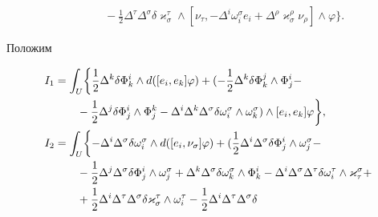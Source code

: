 \begin{pf}
\begin{align*}
&\qquad-\frac{1}{2}\Delta^{\tau}\Delta^{\sigma}\delta


\varkappa^{\tau}_{\sigma}\wedge[\nu_{\tau},


-\Delta^i\omega^{\sigma}_ie_i+\Delta^{\rho}\varkappa^{\rho}_{\sigma}


\nu_{\rho}]\wedge\varphi\biggr\}.


\end{align*}





Положим


\begin{align}


I_1&=\int_{U}\biggl\{\frac{1}{2}\Delta^k\delta\Phi^i_k


\wedge d([e_i,e_k]\varphi)+(-\frac{1}{2}\Delta^k\delta


\Phi^j_k\wedge\Phi^i_j-\notag\\


%


&\qquad-\frac{1}{2}\Delta^j\delta\Phi^i_j\wedge\Phi^k_j-


\Delta^i\Delta^k\Delta^{\sigma}\delta\omega^{\sigma}_i


\wedge\omega^{\sigma}_k)\wedge[e_i,e_k]\varphi\biggr\},\\


%


I_2&=\int_{U}\biggl\{-\Delta^i\Delta^{\sigma}\delta\omega^{\sigma}_i


\wedge d([e_i,\nu_{\sigma}]\varphi)+(\frac{1}{2}\Delta^i\Delta^{\sigma}


\delta\Phi^i_j\wedge\omega^{\sigma}_j-\notag\\


%


&\qquad-\frac{1}{2}\Delta^j\Delta^{\sigma}\delta\Phi^i_j\wedge


\omega^{\sigma}_j+\Delta^k\Delta^{\sigma}\delta\omega^{\sigma}_k


\wedge\Phi^i_k-\Delta^i\Delta^{\sigma}\Delta^{\tau}\delta


\omega^{\tau}_i\wedge\varkappa^{\sigma}_{\tau}+\notag\\


%


&\qquad+\frac{1}{2}\Delta^i\Delta^{\tau}\Delta^{\sigma}


\delta\varkappa^{\tau}_{\sigma}\wedge\omega^{\tau}_i-


\frac{1}{2}\Delta^i\Delta^{\tau}\Delta^{\sigma}\delta



\end{align}
\end{pf}
